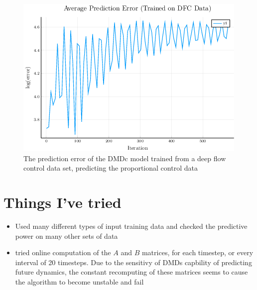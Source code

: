 \documentclass{article}
\begin{document}
\begin{figure}
  \centering
  \includegraphics[scale=0.5]{../images/pred_error_not_working}
  \caption{The prediction error of the DMDc model trained from a deep flow control data set, predicting the proportional control data}
  \label{fig:pred_error_working}
\end{figure}

\section*{Things I've tried}

\begin{itemize}
  \item Used many different types of input training data and checked the predictive power on many other sets of data
  \item tried online computation of the $A$ and $B$ matrices, for each timestep, or every interval of 20 timesteps. Due to the sensitivy of DMDs capbility of predicting future dynamics, the constant recomputing of these matrices seems to cause the algorithm to become unstable and fail
\end{itemize}
\end{document}
